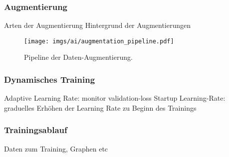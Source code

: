 \subsubsection{Augmentierung}
\label{sec:daten_augmentierung}

Arten der Augmentierung
Hintergrund der Augmentierungen

\begin{figure}
    \centering
    \texttt{[image: imgs/ai/augmentation\_pipeline.pdf]}
    \caption{Pipeline der Daten-Augmentierung.}
    \label{img:augmentierungs_pipeline}
\end{figure}

\subsubsection{Dynamisches Training}

Adaptive Learning Rate: monitor validation-loss
Startup Learning-Rate: graduelles Erhöhen der Learning Rate zu Beginn des Trainings

\subsubsection{Trainingsablauf}

Daten zum Training, Graphen etc


